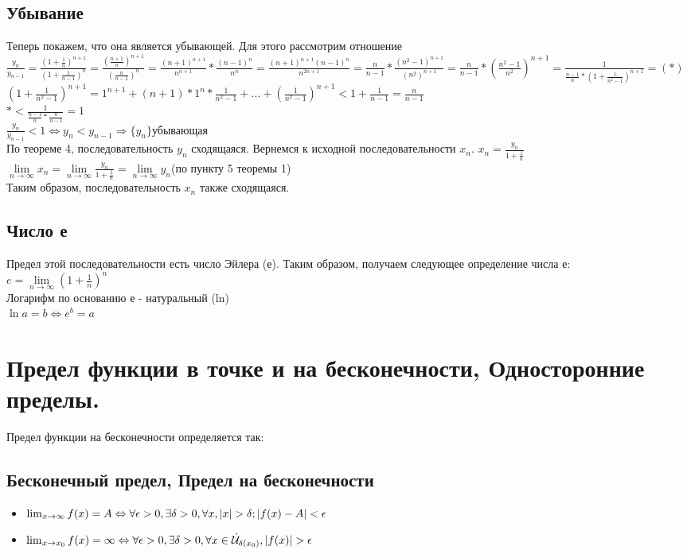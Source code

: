 \documentclass[oneside]{book}
\begin{document}
\begin{enumerate}
\section{Убывание}
Теперь покажем, что она является убывающей. Для этого рассмотрим отношение
$\frac{y_n}{y_{n-1}}=\frac{(1+\frac{1}{n})^{n+1}}{(1+\frac{1}{n-1})^n}=\frac{(\frac{n+1}{n})^{n+1}}{(\frac{n}{n-1})^n}=\frac{(n+1)^{n+1}}{n^{n+1}}*\frac{(n-1)^n}{n^n}=\frac{(n+1)^{n+1}(n-1)^{n}}{n^{2n+1}}=\frac{n}{n-1}*\frac{(n^2-1)^{n+1}}{(n^2)^{n+1}}=\frac{n}{n-1}*(\frac{n^2-1}{n^2})^{n+1}=\frac{1}{\frac{n-1}{n}*(1+\frac{1}{n^2-1})^{n+1}}=(*)$\\
$(1+\frac{1}{n^2-1})^{n+1}=1^{n+1}+(n+1)*1^n*\frac{1}{n^2-1}+...+(\frac{1}{n^2-1})^{n+1}<1+\frac{1}{n-1}=\frac{n}{n-1}$\\
$*<\frac{1}{\frac{n-1}{n}*\frac{n}{n-1}}=1$
\\$\frac{y_n}{y_{n-1}}<1\Leftrightarrow y_n<y_{n-1} \Rightarrow \{y_n\} $убывающая
\\По теореме 4, последовательность $y_n$ сходящаяся. Вернемся к исходной последовательности $x_n$.
$x_n=\frac{y_n}{1+\frac{1}{n}}$\\
$\lim \limits_{n\rightarrow \infty}x_n=\lim \limits_{n\rightarrow \infty}\frac{y_n}{1+\frac{1}{n}}=\lim \limits_{n\rightarrow \infty}y_n$(по пункту 5 теоремы 1)\\
Таким образом, последовательность $x_n$ также сходящаяся.
\section{Число е}
Предел этой последовательности есть число Эйлера (е).
Таким образом, получаем следующее определение числа е:\\
$e=\lim \limits_{n\rightarrow \infty}(1+\frac{1}{n})^n$
\\Логарифм по основанию е - натуральный (ln)\\
$\ln a = b \Leftrightarrow e^b=a$

\setcounter{chapter}{8}
\chapter{Предел функции в точке и на бесконечности, Односторонние пределы.}

Предел функции на бесконечности определяется так:
\section{Бесконечный предел, Предел на бесконечности}
\begin{itemize}
	\item $\lim_{x \rightarrow \infty}{f(x)} = A \Leftrightarrow \\ \forall \epsilon > 0, \exists \delta > 0,
	\forall x, |x| > \delta; |f(x) - A| < \epsilon$
	\item $\lim_{x \rightarrow x_0}{f(x)} = \infty \Leftrightarrow \\ \forall \epsilon > 0, \exists \delta > 0,
	\forall x \in \dot{\mathcal{U}}_{\delta(x_0)}, |f(x)| > \epsilon$
\end{itemize}


\end{enumerate}
\end{document}
